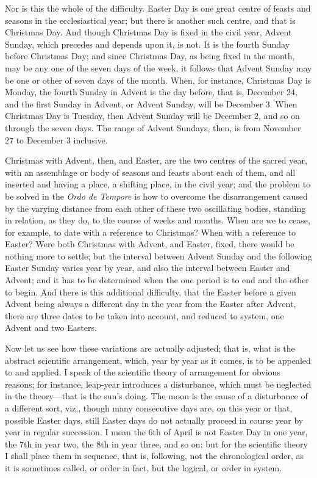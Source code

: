 Nor is this the whole of the
difficulty. Easter Day is one great centre of feasts and seasons in
the ecclesiastical year; but there is another such centre, and that is
Christmas Day. And though Christmas Day is fixed in the civil year,
Advent Sunday, which precedes and depends upon it, is not. It is the
fourth Sunday before Christmas Day; and since Christmas Day, as being
fixed in the month, may be any one of the seven days of the week, it
follows that Advent Sunday may be one or other of seven days of the
month. When, for instance, Christmas Day is Monday, the fourth Sunday
in Advent is the day before, that is, December 24, and the first
Sunday in Advent, or Advent Sunday, will be December 3. When Christmas
Day is Tuesday, then Advent Sunday will be December 2, and so on
through the seven days. The range of Advent Sundays, then, is from
November 27 to December 3 inclusive.

Christmas with Advent, then,
and Easter, are the two centres of the sacred year, with an assemblage
or body of seasons and feasts about each of them, and all inserted and
having a place, a shifting place, in the civil year; and the problem
to be solved in the \emph{Ordo de Tempore} is how to overcome the
disarrangement caused by the varying distance from each other of these
two oscillating bodies, standing in relation, as they do, to the
course of weeks and months. When are we to cease, for example, to date
with a reference to Christmas? When with a reference to Easter? Were
both Christmas with Advent, and Easter, fixed, there would be nothing
more to settle; but the interval between Advent Sunday and the
following Easter Sunday varies year by year, and also the interval
between Easter and Advent; and it has to be determined when the one
period is to end and the other to begin. And there is this additional
difficulty, that the Easter before a given Advent being always a
different day in the year from the Easter after Advent, there are
three dates to be taken into account, and reduced to system, one
Advent and two Easters.

Now let us see how these
variations are actually adjusted; that is, what is the abstract
scientific arrangement, which, year by year as it comes, is to be
appealed to and applied. I speak of the scientific theory of
arrangement for obvious reasons; for instance, leap-year introduces a
disturbance, which must be neglected in the theory—that is the
sun's doing. The moon is the cause of a disturbance of a different
sort, viz., though many consecutive days are, on this year or that,
possible Easter days, still Easter days do not actually proceed
in course year by year in regular succession. I mean the 6th of April
is not Easter Day in one year, the 7th in year two, the 8th in year
three, and so on; but for the scientific theory I shall place them in
sequence, that is, following, not the chronological order, as it is
sometimes called, or order in fact, but the logical, or order in
system.

